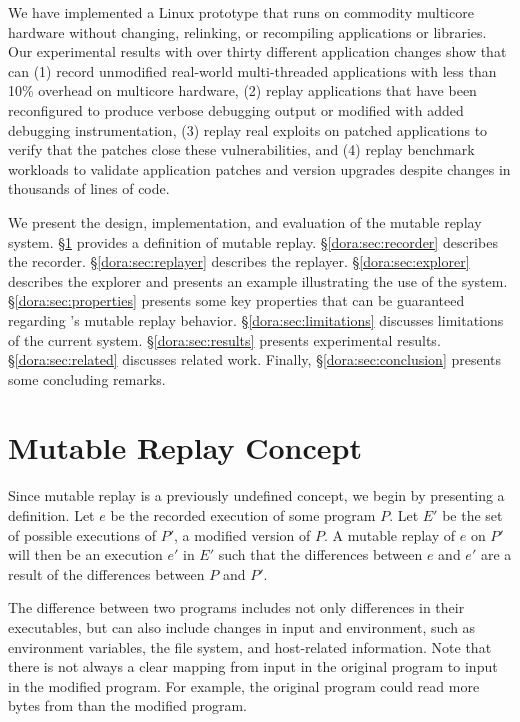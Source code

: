 We have implemented a {\dora} Linux prototype that runs on
commodity multicore hardware without changing, relinking, or
recompiling applications or libraries.  Our experimental results with
over thirty different application changes show that {\dora} can (1)
record unmodified real-world multi-threaded applications with less
than 10\% overhead on multicore hardware, (2) replay applications that
have been reconfigured to produce verbose debugging output or modified
with added debugging instrumentation, (3) replay real exploits on
patched applications to verify that the patches close these
vulnerabilities, and (4) replay benchmark workloads to validate
application patches and version upgrades despite changes in thousands of lines
of code.

We present the design, implementation, and evaluation of the
{\dora} mutable replay system.
\S\ref{dora:sec:definition} provides a definition of mutable replay.
\S\ref{dora:sec:recorder} describes the {\dora} recorder.
\S\ref{dora:sec:replayer} describes the {\dora} replayer.
\S\ref{dora:sec:explorer} describes the {\dora} explorer and presents an
example illustrating the use of the system.
\S\ref{dora:sec:properties} presents some key properties that can be guaranteed regarding
{\dora}'s mutable replay behavior.
\S\ref{dora:sec:limitations} discusses limitations of the current system.
\S\ref{dora:sec:results} presents experimental results.
\S\ref{dora:sec:related} discusses related work.
Finally, \S\ref{dora:sec:conclusion} presents some concluding remarks.

\section{Mutable Replay Concept}
\label{dora:sec:definition}

Since mutable replay is a previously undefined concept, we begin by
presenting a definition.  Let $e$ be the recorded execution of some
program $P$. Let $E'$ be the set of possible executions of $P'$, a
modified version of $P$. A mutable replay of $e$ on $P'$ will then be
an execution $e'$ in $E'$ such that the differences between $e$ and
$e'$ are a result of the differences between $P$ and $P'$.

The difference between two programs includes not only differences in
their executables, but can also include changes in input and
environment, such as environment variables, the file system,
and host-related information.
Note that there is
not always a clear mapping from input in the original program to input
in the modified program. For example, the original program could read more bytes
from  than the modified program.

